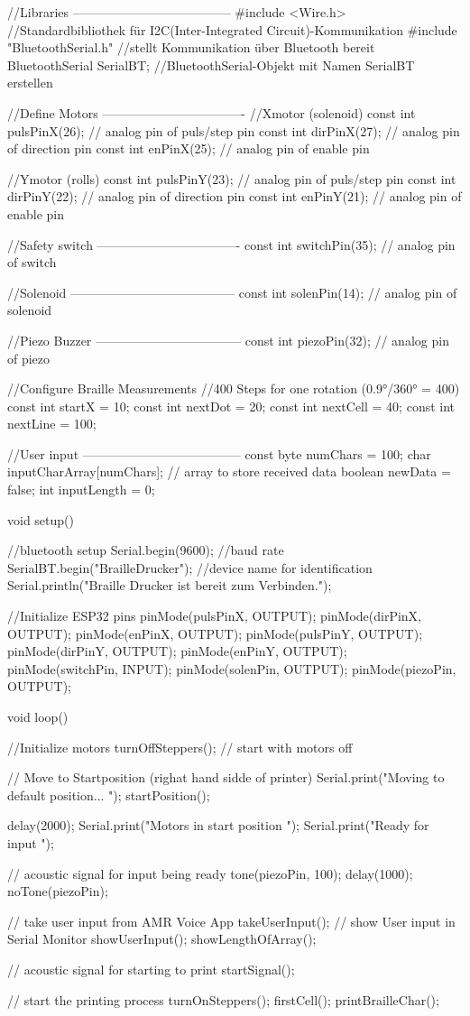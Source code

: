 //Libraries --------------------------------------
#include <Wire.h> 	//Standardbibliothek für I2C(Inter-Integrated Circuit)-Kommunikation
#include "BluetoothSerial.h"  //stellt Kommunikation über Bluetooth bereit
BluetoothSerial SerialBT;	//BluetoothSerial-Objekt mit Namen SerialBT erstellen

//Define Motors ----------------------------------
//Xmotor (solenoid)   
const int pulsPinX(26); // analog pin of puls/step pin
const int dirPinX(27);  // analog pin of direction pin
const int enPinX(25);   // analog pin of enable pin

//Ymotor (rolls)
const int pulsPinY(23); // analog pin of puls/step pin
const int dirPinY(22);  // analog pin of direction pin
const int enPinY(21);   // analog pin of enable pin

//Safety switch ----------------------------------
const int switchPin(35); // analog pin of switch

//Solenoid ---------------------------------------
const int solenPin(14); // analog pin of solenoid

//Piezo Buzzer -----------------------------------
const int piezoPin(32); // analog pin of piezo

//Configure Braille Measurements
//400 Steps for one rotation (0.9°/360° = 400)
const int startX = 10;
const int nextDot = 20;
const int nextCell = 40;
const int nextLine = 100;

//User input --------------------------------------
const byte numChars = 100;
char inputCharArray[numChars];  // array to store received data
boolean newData = false;
int inputLength = 0;

void setup() {
  //bluetooth setup
  Serial.begin(9600);  //baud rate
  SerialBT.begin("BrailleDrucker"); //device name for identification
  Serial.println("Braille Drucker ist bereit zum Verbinden.");

  //Initialize ESP32 pins
  pinMode(pulsPinX, OUTPUT);
  pinMode(dirPinX, OUTPUT);
  pinMode(enPinX, OUTPUT);
  pinMode(pulsPinY, OUTPUT);
  pinMode(dirPinY, OUTPUT);
  pinMode(enPinY, OUTPUT);
  pinMode(switchPin, INPUT);  
  pinMode(solenPin, OUTPUT); 
  pinMode(piezoPin, OUTPUT); 
}

void loop() {
  //Initialize motors
  turnOffSteppers(); // start with motors off
  
  // Move to Startposition (righat hand sidde of printer)
  Serial.print("Moving to default position... \n");
  startPosition();
 
  delay(2000);
  Serial.print("Motors in start position \n");
  Serial.print("Ready for input \n");

  // acoustic signal for input being ready
  tone(piezoPin, 100);
  delay(1000);
  noTone(piezoPin);

  // take user input from AMR Voice App
  takeUserInput();
  // show User input in Serial Monitor
  showUserInput();
  showLengthOfArray();
  
  // acoustic signal for starting to print
  startSignal();

  // start the printing process
  turnOnSteppers();
  firstCell();
  printBrailleChar();
}
